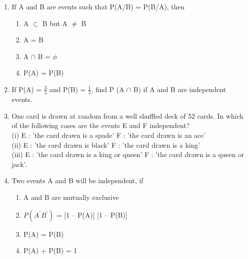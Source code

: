 \begin{enumerate}[label=\thesection.\arabic*.,ref=\thesection.\theenumi]
\item If A and B are events such that P(A/B) = P(B/A), then
\begin{enumerate}
\item A $\subset$ B but A $\neq$ B
\item A = B
\item A $\cap$ B = $\phi$
\item P(A) = P(B)
\end{enumerate}
\solution


\item If P(A) = $\frac{3}{5}$ and P(B) = $\frac{1}{5}$, find P (A $\cap$ B) if A and B are independent events.\\\solution

\item One card is drawn at random from a well shuffled deck of 52 cards. In which of the following cases are the events E and F independent?\\
(i) E : 'the card drawn is a spade'
F : 'the card drawn is an ace'\\
(ii) E : 'the card drawn is black'
F : 'the card drawn is a king'\\
(iii) E : 'the card drawn is a king or queen'
F : 'the card drawn is a queen or jack'.\\
\solution

\item Two events A and B will be independent, if
\begin{enumerate}
\item A and B are mutually exclusive
\item $P(A^{\prime}B^{\prime})$ = [1 – P(A)] [1 – P(B)]
\item P(A) = P(B)
\item P(A) + P(B) = 1
\end{enumerate}
\solution

\end{enumerate}

